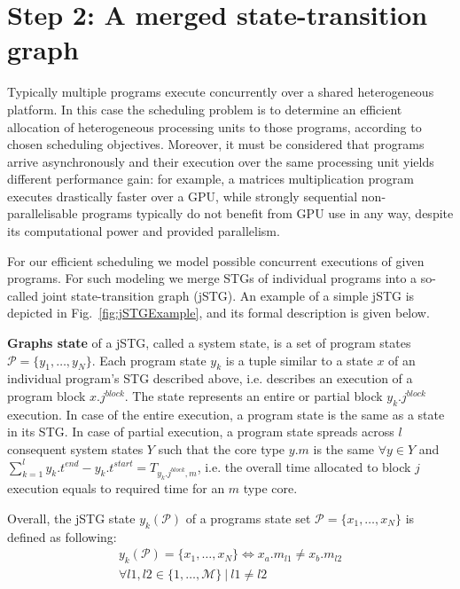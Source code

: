   


\section{Step 2: A merged state-transition graph}
\label{sec:joint_graph}

Typically multiple programs execute concurrently over a shared heterogeneous platform. In this case the scheduling problem is to determine an efficient allocation of heterogeneous processing units to those programs, according to chosen scheduling objectives. Moreover, it must be considered that programs arrive asynchronously and their execution over the same processing unit yields different performance gain: for example, a matrices multiplication program executes drastically faster over a GPU, while strongly sequential non-parallelisable programs typically do not benefit from GPU use in any way, despite its computational power and provided parallelism.

For our efficient scheduling we model possible concurrent executions of given programs. For such modeling we merge STGs of individual programs into a so-called joint state-transition graph (jSTG). An example of a simple jSTG is depicted in Fig.~\ref{fig:jSTGExample}, and its formal description is given below.

\textbf{Graphs state} of a jSTG, called a system state, is a set of program states $\mathcal{P} = \{y_1,\ldots,y_N\}$. Each program state $y_k$ is a tuple similar to a state $x$ of an individual program's STG described above, i.e. describes an execution of a program block $x.j^{block}$. The state represents an entire or partial block $y_k.j^{block}$ execution. In case of the entire execution, a program state is the same as a state in its STG.  In case of partial execution, a program state spreads across $l$ consequent system states $Y$ such that the core type $y.m$ is the same $\forall y \in Y$ and $\sum_{k=1}^l{y_k.t^{end}-y_k.t^{start}}=T_{y_k.j^{block},m}$, i.e. the overall time allocated to block $j$ execution equals to required time for an $m$ type core.

Overall, the jSTG state $y_k(\mathcal{P})$ of a programs state set $\mathcal{P}=\{x_1,\ldots,x_N\}$ is defined as following:
%
\begin{equation}
\begin{aligned}
y_k(\mathcal{P}) = \{x_1,\ldots,x_N\} \iff x_a.m_{l1} \neq x_b.m_{l2} \\
\forall l1,l2 \in \{1,\ldots,\mathcal{M}\}\ |\ l1 \neq l2
\end{aligned}
\label{eq:jGraphState}
\end{equation}
%

